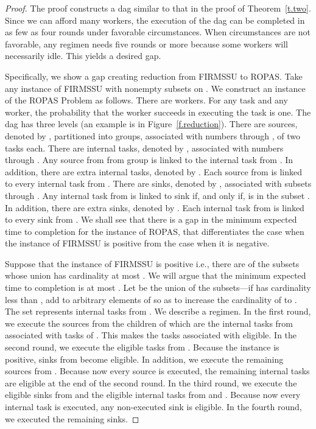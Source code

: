 \documentclass[letterpaper,11pt]{article}
\begin{document}
\begin{proof}
The proof constructs a dag similar to that in the proof of Theorem~\ref{t.two}. Since we can afford many workers, the execution of the dag can be completed in as few as four rounds under favorable circumstances. When circumstances are not favorable, any regimen needs five rounds or more because some workers will necessarily idle. This yields a desired gap.

Specifically, we show a gap creating reduction from FIRMSSU to ROPAS.
Take any instance of FIRMSSU with  nonempty subsets  on . 
We construct an instance of the ROPAS Problem as follows. 
There are  workers. For any task and any worker, the probability that the worker succeeds in executing the task is one. The dag has three levels (an example is in Figure~\ref{f.reduction}). There are  sources, denoted by , partitioned into  groups, associated with numbers  through , of two tasks each. There are  internal tasks, denoted by , associated with numbers  through . Any source from  from group  is linked to the internal task  from . In addition, there are  extra internal tasks, denoted by . Each source from  is linked to every internal task from . There are  sinks, denoted by , associated with subsets  through . Any internal task  from  is linked to sink  if, and only if,  is in the subset . In addition, there are  extra sinks, denoted by . Each internal task from  is linked to every sink from .
We shall see that there is a gap in the minimum expected time to completion for the instance of ROPAS, that differentiates the case when the instance of FIRMSSU is positive from the case when it is negative. 


Suppose that the instance of FIRMSSU is positive i.e., there are  of the subsets whose union has cardinality at most . We will argue that the minimum expected time to completion is at most . Let  be the union of the  subsets---if  has cardinality less than , add to  arbitrary elements of  so as to increase the cardinality of  to . The set  represents  internal tasks from . 
We describe a regimen. In the first round, we execute the  sources from  the children of which are the  internal tasks from  associated with tasks of . This makes the tasks associated with  eligible. In the second round, we execute the  eligible tasks from . Because the instance is positive,  sinks from  become eligible. In addition, we execute the remaining  sources from . Because now every source is executed, the remaining  internal tasks are eligible at the end of the second round. In the third round, we execute the  eligible sinks from  and the  eligible internal tasks from  and . Because now every internal task is executed, any non-executed sink is eligible. In the fourth round, we executed the remaining  sinks.


\end{proof}
\end{document}
